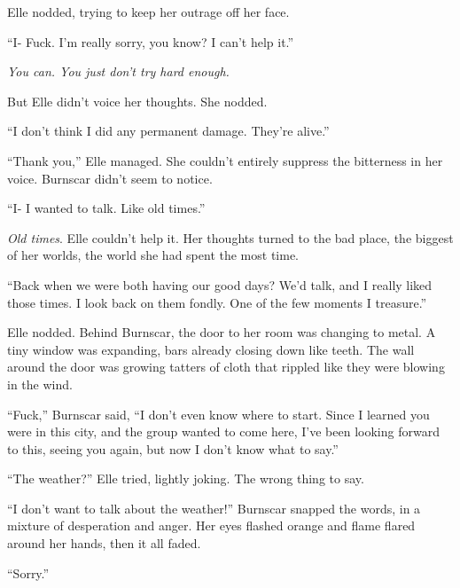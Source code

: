 Elle nodded, trying to keep her outrage off her face.



``I- Fuck.  I'm really sorry, you know?  I can't help it.''



\emph{You can.  You just don't try hard enough.}



But Elle didn't voice her thoughts.  She nodded.



``I don't think I did any permanent damage.  They're alive.''



``Thank you,'' Elle managed.  She couldn't entirely suppress the bitterness in her voice.  Burnscar didn't seem to notice.



``I- I wanted to talk.  Like old times.''



\emph{Old times}.  Elle couldn't help it.  Her thoughts turned to the bad place, the biggest of her worlds, the world she had spent the most time.



``Back when we were both having our good days?  We'd talk, and I really liked those times.  I look back on them fondly.  One of the few moments I treasure.''



Elle nodded.  Behind Burnscar, the door to her room was changing to metal.  A tiny window was expanding, bars already closing down like teeth.  The wall around the door was growing tatters of cloth that rippled like they were blowing in the wind.



``Fuck,'' Burnscar said, ``I don't even know where to start.  Since I learned you were in this city, and the group wanted to come here, I've been looking forward to this, seeing you again, but now I don't know what to say.''



``The weather?'' Elle tried, lightly joking. The wrong thing to say.



``I don't want to talk about the weather!'' Burnscar snapped the words, in a mixture of desperation and anger.  Her eyes flashed orange and flame flared around her hands, then it all faded.



``Sorry.''




